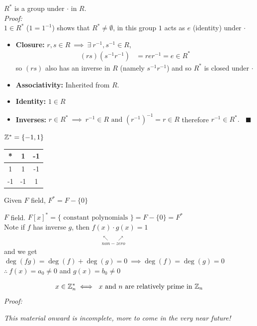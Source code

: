 \begin{proposition}
    $R^*$ is a group under $\cdot$ in $R$. \\

    \noindent \textit{Proof:} \\
    \indent $1\in R^*$  ($1=1^{-1}$) shows that $R^* \neq \emptyset$, in this group $1$ acts as $e$ (identity) under $\cdot$
    \begin{itemize}
        \item \textbf{Closure:} $r,s \in R \ \implies \ \exists \ r^{-1},s^{-1} \in R$, 
        \begin{align}
            (rs)(s^{-1}r^{-1})&= rer^{-1}=e \in R^* \nonumber
        \end{align}
        so $(rs)$ also has an inverse in $R$ (namely $s^{-1}r^{-1}$) and so $R^*$ is closed under $\cdot$
        \item \textbf{Associativity:} Inherited from $R$.
        \item \textbf{Identity:} $1\in R$
        \item \textbf{Inverses:} $r\in R^* \ \implies \ r^{-1} \in R \text{ and } (r^{-1})^{-1}=r\in R$ therefore $r^{-1}\in R^*. \ \ \ \ \blacksquare$
    \end{itemize}
\end{proposition}

\begin{example}
    ${\mathbb{ Z}}^{*}= \{-1,1\}$ \\ \steezybreak
    
    \begin{tabular}{|c|c|c|}
        *&1&-1 \\ \hline
        1&1&-1 \\ \hline
        -1&-1&1 
    \end{tabular}
\end{example}
\begin{example} 
    Given $F$ field, $F^*=F-\{0\}$
\end{example}

\begin{example}
    $F$ field. $F[x]^* = \{\text{ constant polynomials }\} = F-\{0\}=F^*$ \\ \steezybreak
    \noindent Note if $f$ has inverse $g$, then $\underset{\substack{\ \\ \nwarrow \ \ \ \ \ \ \ \nearrow \\ non-zero}}{f(x)\cdot g(x)}=1$ \\ 
    \noindent and we get $\deg(fg)=\deg(f)+\deg(g)=0 \ \implies \deg(f)=\deg(g)=0$ \\
\noindent $\therefore \ f(x)=a_0 \neq 0$ and $g(x)=b_0 \neq 0$ \\
\end{example}

\begin{proposition}
    \begin{align}
        x\in {\mathbb{ Z}}_n^* \iff \ x \text{ and } n \text{ are relatively prime in }{\mathbb{ Z}}_n \nonumber 
    \end{align}
    \textit{Proof:}
\end{proposition}

\steezybreak \textit{This material onward is incomplete, more to come in the very near future!}
